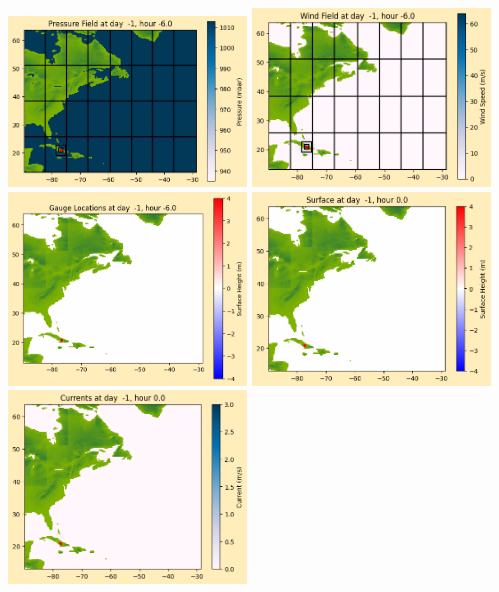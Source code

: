 \documentclass[11pt]{article}
\begin{document}
\includegraphics[width=0.475\textwidth]{frame0007fig1012.png}
\vskip 10pt 
\includegraphics[width=0.475\textwidth]{frame0007fig1013.png}
\includegraphics[width=0.475\textwidth]{frame0007fig1014.png}
\vskip 10pt 
\includegraphics[width=0.475\textwidth]{frame0008fig1001.png}
\includegraphics[width=0.475\textwidth]{frame0008fig1002.png}
\end{document}
